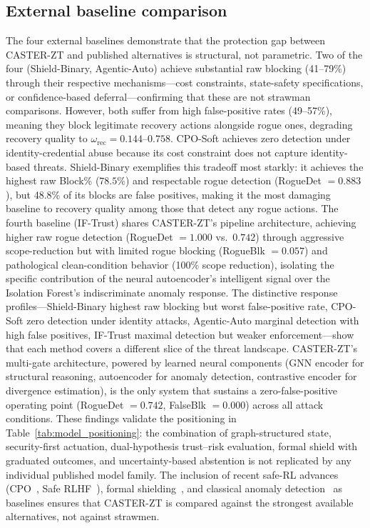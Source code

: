 \documentclass[10pt,journal,compsoc]{IEEEtran}
\begin{document}
\subsection{External baseline comparison}
The four external baselines demonstrate that the protection gap between CASTER-ZT and published alternatives is structural, not parametric.
Two of the four (Shield-Binary, Agentic-Auto) achieve substantial raw blocking (41--79\%) through their respective mechanisms---cost constraints, state-safety specifications, or confidence-based deferral---confirming that these are not strawman comparisons.
However, both suffer from high false-positive rates (49--57\%), meaning they block legitimate recovery actions alongside rogue ones, degrading recovery quality to $\omega_{\mathrm{rec}} = 0.144$--$0.758$.  CPO-Soft achieves zero detection under identity-credential abuse because its cost constraint does not capture identity-based threats.
Shield-Binary exemplifies this tradeoff most starkly: it achieves the highest raw Block\% ($78.5\%$) and respectable rogue detection (RogueDet $= 0.883$), but 48.8\% of its blocks are false positives, making it the most damaging baseline to recovery quality among those that detect any rogue actions.
The fourth baseline (IF-Trust) shares CASTER-ZT's pipeline architecture, achieving higher raw rogue detection (RogueDet $= 1.000$ vs.\ $0.742$) through aggressive scope-reduction but with limited rogue blocking (RogueBlk $= 0.057$) and pathological clean-condition behavior (100\% scope reduction), isolating the specific contribution of the neural autoencoder's intelligent signal over the Isolation Forest's indiscriminate anomaly response.
The distinctive response profiles---Shield-Binary highest raw blocking but worst false-positive rate, CPO-Soft zero detection under identity attacks, Agentic-Auto marginal detection with high false positives, IF-Trust maximal detection but weaker enforcement---show that each method covers a different slice of the threat landscape.
CASTER-ZT's multi-gate architecture, powered by learned neural components (GNN encoder for structural reasoning, autoencoder for anomaly detection, contrastive encoder for divergence estimation), is the only system that sustains a zero-false-positive operating point (RogueDet $= 0.742$, FalseBlk $= 0.000$) across all attack conditions.
These findings validate the positioning in Table~\ref{tab:model_positioning}: the combination of graph-structured state, security-first actuation, dual-hypothesis trust--risk evaluation, formal shield with graduated outcomes, and uncertainty-based abstention is not replicated by any individual published model family.
The inclusion of recent safe-RL advances (CPO~\cite{achiam2017cpo}, Safe RLHF~\cite{dai2024saferlhf}), formal shielding~\cite{alshiekh2018shielding}, and classical anomaly detection~\cite{zahoor2025ifocsvm} as baselines ensures that CASTER-ZT is compared against the strongest available alternatives, not against strawmen.
\end{document}
